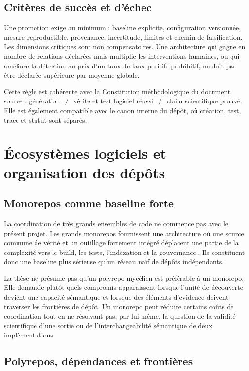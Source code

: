 \section{Critères de succès et d'échec}

Une promotion exige au minimum : baseline explicite, configuration versionnée, mesure reproductible, provenance, incertitude, limites et chemin de falsification. Les dimensions critiques sont non compensatoires. Une architecture qui gagne en nombre de relations déclarées mais multiplie les interventions humaines, ou qui améliore la détection au prix d'un taux de faux positifs prohibitif, ne doit pas être déclarée supérieure par moyenne globale.

Cette règle est cohérente avec la Constitution méthodologique du document source : génération $\neq$ vérité et test logiciel réussi $\neq$ claim scientifique prouvé. Elle est également compatible avec le canon interne du dépôt, où création, test, trace et statut sont séparés.

\chapter{Écosystèmes logiciels et organisation des dépôts}

\section{Monorepos comme baseline forte}

La coordination de très grands ensembles de code ne commence pas avec le présent projet. Les grands monorepos fournissent une architecture où une source commune de vérité et un outillage fortement intégré déplacent une partie de la complexité vers le build, les tests, l'indexation et la gouvernance \cite{potvin2016monorepo}. Ils constituent donc une baseline plus sérieuse qu'un réseau naïf de dépôts indépendants.

La thèse ne présume pas qu'un polyrepo mycélien est préférable à un monorepo. Elle demande plutôt quels compromis apparaissent lorsque l'unité de découverte devient une capacité sémantique et lorsque des éléments d'evidence doivent traverser les frontières de dépôt. Un monorepo peut réduire certains coûts de coordination tout en ne résolvant pas, par lui-même, la question de la validité scientifique d'une sortie ou de l'interchangeabilité sémantique de deux implémentations.

\section{Polyrepos, dépendances et frontières}

